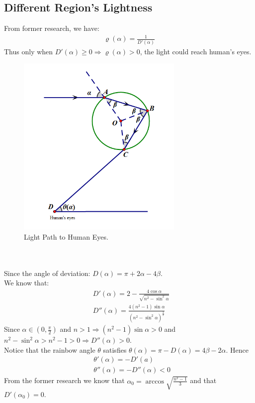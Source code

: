 \documentclass{article}
\begin{document}
\begin{spacing}{1.5}
\subsection{Different Region's Lightness}
From former research, we have:
\begin{align*}
\varrho(\alpha)=\frac{1}{D'(\alpha)}
\end{align*}
Thus only when $D'(\alpha)\geq0\Rightarrow \varrho(\alpha)>0$, the light could reach human's eyes.\\
\begin{figure}[!htb]
\centering
\includegraphics[width=8cm]{8.png}
\caption{Light Path to Human Eyes.}
\end{figure}
\\
\newpage
\ \\
Since the angle of deviation: $D(\alpha)=\pi+2\alpha-4\beta$.\\
We know that: 
\begin{align*}
&D'(\alpha)=2-\frac{4\cos\alpha}{\sqrt{n^2-\sin^2\alpha}}\ \\
&D''(\alpha)=\frac{4(n^2-1)\sin\alpha}{(n^2-\sin^2\alpha)^{\frac{3}{2}}}
\end{align*}
Since $\alpha\in(0,\frac{\pi}{2})$ and $n>1\Rightarrow (n^2-1)\sin\alpha>0$ and $n^2-\sin^2\alpha>n^2-1>0\Rightarrow D''(\alpha)>0$.\\
Notice that the rainbow angle $\theta$ satisfies $\theta(\alpha)=\pi-D(\alpha)=4\beta-2\alpha$. Hence 
\begin{align*}
&\theta'(\alpha)=-D'(a)\\&\theta''(\alpha)=-D''(\alpha)<0
\end{align*}
From the former research we know that $\alpha_0=\arccos\sqrt{\frac{n^2-1}{3}}$ and that $D'(\alpha_0)=0.$\\

\end{spacing}
\end{document}
